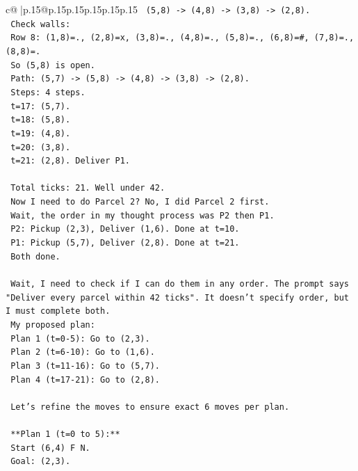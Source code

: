 \documentclass{article}
\begin{document}
{\begin{supertabular}{c@{$\;$}|p{.15\linewidth}@{}p{.15\linewidth}p{.15\linewidth}p{.15\linewidth}p{.15\linewidth}p{.15\linewidth}}
{{{\texttt{    (5,8) {-}> (4,8) {-}> (3,8) {-}> (2,8).} \\
\texttt{    Check walls:} \\
\texttt{    Row 8: (1,8)=., (2,8)=x, (3,8)=., (4,8)=., (5,8)=., (6,8)=\#, (7,8)=., (8,8)=.} \\
\texttt{    So (5,8) is open.} \\
\texttt{    Path: (5,7) {-}> (5,8) {-}> (4,8) {-}> (3,8) {-}> (2,8).} \\
\texttt{    Steps: 4 steps.} \\
\texttt{    t=17: (5,7).} \\
\texttt{    t=18: (5,8).} \\
\texttt{    t=19: (4,8).} \\
\texttt{    t=20: (3,8).} \\
\texttt{    t=21: (2,8). Deliver P1.} \\
\\ 
\texttt{    Total ticks: 21. Well under 42.} \\
\texttt{    Now I need to do Parcel 2? No, I did Parcel 2 first.} \\
\texttt{    Wait, the order in my thought process was P2 then P1.} \\
\texttt{    P2: Pickup (2,3), Deliver (1,6). Done at t=10.} \\
\texttt{    P1: Pickup (5,7), Deliver (2,8). Done at t=21.} \\
\texttt{    Both done.} \\
\\ 
\texttt{    Wait, I need to check if I can do them in any order. The prompt says "Deliver every parcel within 42 ticks". It doesn't specify order, but I must complete both.} \\
\texttt{    My proposed plan:} \\
\texttt{    Plan 1 (t=0{-}5): Go to (2,3).} \\
\texttt{    Plan 2 (t=6{-}10): Go to (1,6).} \\
\texttt{    Plan 3 (t=11{-}16): Go to (5,7).} \\
\texttt{    Plan 4 (t=17{-}21): Go to (2,8).} \\
\\ 
\texttt{    Let's refine the moves to ensure exact 6 moves per plan.} \\
\\ 
\texttt{    **Plan 1 (t=0 to 5):**} \\
\texttt{    Start (6,4) F N.} \\
\texttt{    Goal: (2,3).} \\
}}}
\end{supertabular}}
\end{document}
